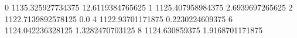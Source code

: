 0 1135.325927734375 12.6119384765625
1 1125.407958984375 2.6939697265625
2 1122.7139892578125 0.0
4 1122.93701171875 0.2230224609375
6 1124.042236328125 1.3282470703125
8 1124.630859375 1.9168701171875

